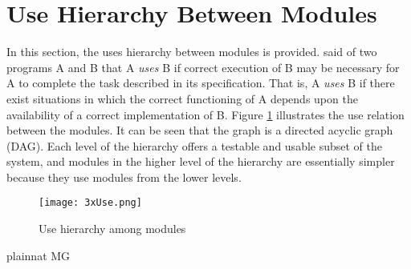 \documentclass[12pt, titlepage]{article}
\begin{document}
\section{Use Hierarchy Between Modules} \label{SecUse}

In this section, the uses hierarchy between modules is
provided. \citet{Parnas1978} said of two programs A and B that A {\em uses} B if
correct execution of B may be necessary for A to complete the task described in
its specification. That is, A {\em uses} B if there exist situations in which
the correct functioning of A depends upon the availability of a correct
implementation of B.  Figure \ref{FigUH} illustrates the use relation between
the modules. It can be seen that the graph is a directed acyclic graph
(DAG). Each level of the hierarchy offers a testable and usable subset of the
system, and modules in the higher level of the hierarchy are essentially simpler
because they use modules from the lower levels.

\begin{figure}[H]
\centering
\texttt{[image: 3xUse.png]}
\caption{Use hierarchy among modules}
\label{FigUH}
\end{figure}


 {plainnat}
 {MG}
\end{document}
